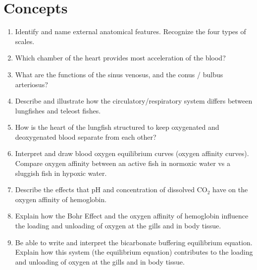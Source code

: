 \documentclass[nofonts, letterpaper]{tufte-handout}
\begin{document}
\section{Concepts}

\begin{enumerate}
	\item Identify and name external anatomical features. Recognize the four types of scales.

	\item Which chamber of the heart provides most acceleration of the blood? 

	\item What are the functions of the sinus venosus, and the conus / bulbus arteriosus?

	\item Describe and illustrate how the circulatory/respiratory system differs between lungfishes and teleost fishes.

	\item How is the heart of the lungfish structured to keep oxygenated and deoxygenated blood separate from each other?

	\item Interpret and draw blood oxygen equilibrium curves (oxygen affinity curves).  Compare oxygen affinity between an active fish in normoxic water vs a sluggish fish in hypoxic water.

	\item Describe the effects that pH and concentration of dissolved CO$_2$ have on the oxygen affinity of hemoglobin.

	\item Explain how the Bohr Effect and the oxygen affinity of hemoglobin influence the loading and unloading of oxygen at the gills and in body tissue.
	
	\item Be able to write and interpret the bicarbonate buffering equilibrium equation. Explain how this system (the equilibrium equation) contributes to the loading and unloading of oxygen at the gills and in body tissue.  
	
\end{enumerate}
\end{document}
